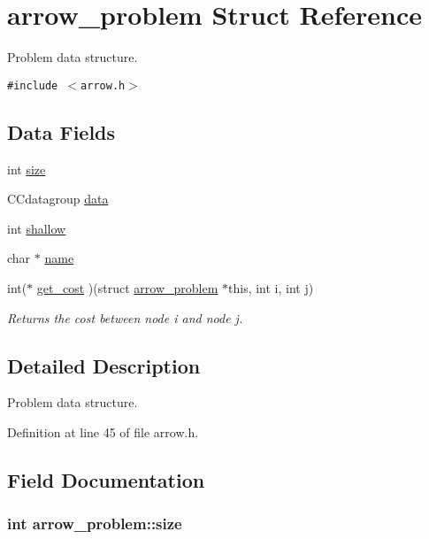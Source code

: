 \hypertarget{structarrow__problem}{
\section{arrow\_\-problem Struct Reference}
\label{structarrow__problem}
}
Problem data structure.  


{\tt \#include $<$arrow.h$>$}

\subsection*{Data Fields}
\begin{CompactItemize}
\item 
int \hyperlink{structarrow__problem_de8573ddc391d06b08b65923fca693ec}{size}
\item 
CCdatagroup \hyperlink{structarrow__problem_5f04fe51bf6438b8f844c8cc06eb5ba0}{data}
\item 
int \hyperlink{structarrow__problem_8c3f4f7794c1430440658d69151b296d}{shallow}
\item 
char $\ast$ \hyperlink{structarrow__problem_4463422357e42b021b77b6e166eaf308}{name}
\item 
int($\ast$ \hyperlink{structarrow__problem_4f1f4c9ef90f240b248e8f39360da769}{get\_\-cost} )(struct \hyperlink{structarrow__problem}{arrow\_\-problem} $\ast$this, int i, int j)
\begin{CompactList}\small\item\em Returns the cost between node i and node j. \item\end{CompactList}\end{CompactItemize}


\subsection{Detailed Description}
Problem data structure. 

Definition at line 45 of file arrow.h.

\subsection{Field Documentation}
\hypertarget{structarrow__problem_de8573ddc391d06b08b65923fca693ec}{
\subsubsection{\setlength{\rightskip}{0pt plus 5cm}int {\bf arrow\_\-problem::size}}}
\label{structarrow__problem_de8573ddc391d06b08b65923fca693ec}


